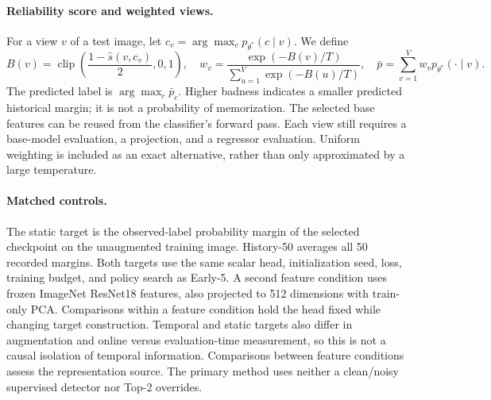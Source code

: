 \paragraph{Reliability score and weighted views.}
For a view $v$ of a test image, let $c_v=\arg\max_c p_{\theta^*}(c\mid v)$. We define
\begin{equation}
 B(v)=\operatorname{clip}\left(\frac{1-\hat s(v,c_v)}2,0,1\right),\quad
 w_v=\frac{\exp(-B(v)/T)}{\sum_{u=1}^{V}\exp(-B(u)/T)},\quad
 \bar p=\sum_{v=1}^{V}w_vp_{\theta^*}(\cdot\mid v).
\end{equation}
The predicted label is $\arg\max_c\bar p_c$. Higher badness indicates a smaller predicted historical margin; it is not a probability of memorization. The selected base features can be reused from the classifier's forward pass. Each view still requires a base-model evaluation, a projection, and a regressor evaluation. Uniform weighting is included as an exact alternative, rather than only approximated by a large temperature.

\paragraph{Matched controls.}
The static target is the observed-label probability margin of the selected checkpoint on the unaugmented training image. History-50 averages all 50 recorded margins. Both targets use the same scalar head, initialization seed, loss, training budget, and policy search as Early-5. A second feature condition uses frozen ImageNet ResNet18 features, also projected to 512 dimensions with train-only PCA. Comparisons within a feature condition hold the head fixed while changing target construction. Temporal and static targets also differ in augmentation and online versus evaluation-time measurement, so this is not a causal isolation of temporal information. Comparisons between feature conditions assess the representation source. The primary method uses neither a clean/noisy supervised detector nor Top-2 overrides.

